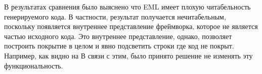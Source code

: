 









В результатах сравнения было выяснено что EML имеет плохую читабельность генерируемого кода.
В частности, результат получается нечитабельным, поскольку появляется внутреннее представление фреймворка, которое не является частью исходного кода.
Это внутреннее представление, однако, позволяет построить покрытие в целом и явно подсветить строки где код не покрыт.
Например, как видно на %
В связи с этим, было принято решение не изменять эту функциональность.

